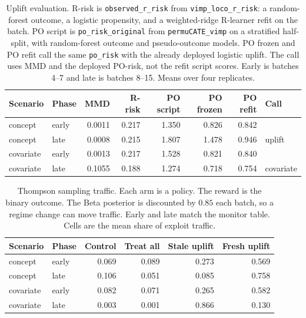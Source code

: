\begin{table}[t]
\centering
\caption{Uplift evaluation. R-risk is \texttt{observed\_r\_risk} from \texttt{vimp\_loco\_r\_risk}: a random-forest outcome, a logistic propensity, and a weighted-ridge R-learner refit on the batch. PO script is \texttt{po\_risk\_original} from \texttt{permuCATE\_vimp} on a stratified half-split, with random-forest outcome and pseudo-outcome models. PO frozen and PO refit call the same \texttt{po\_risk} with the already deployed logistic uplift. The call uses MMD and the deployed PO-risk, not the refit script scores. Early is batches 4--7 and late is batches 8--15. Means over four replicates.}
\label{tab:uplift-monitor}
\begin{tabular}{llrrrrrl}
\toprule
Scenario & Phase & MMD & R-risk & PO script & PO frozen & PO refit & Call \\
\midrule
concept & early & 0.0011 & 0.217 & 1.350 & 0.826 & 0.842 &  \\
concept & late & 0.0008 & 0.215 & 1.807 & 1.478 & 0.946 & uplift \\
covariate & early & 0.0013 & 0.217 & 1.528 & 0.821 & 0.840 &  \\
covariate & late & 0.1055 & 0.188 & 1.274 & 0.718 & 0.754 & covariate \\
\bottomrule
\end{tabular}
\end{table}

\begin{table}[t]
\centering
\caption{Thompson sampling traffic. Each arm is a policy. The reward is the binary outcome. The Beta posterior is discounted by $0.85$ each batch, so a regime change can move traffic. Early and late match the monitor table. Cells are the mean share of exploit traffic.}
\label{tab:uplift-thompson}
\begin{tabular}{llrrrr}
\toprule
Scenario & Phase & Control & Treat all & Stale uplift & Fresh uplift \\
\midrule
concept & early & 0.069 & 0.089 & 0.273 & 0.569 \\
concept & late & 0.106 & 0.051 & 0.085 & 0.758 \\
covariate & early & 0.082 & 0.071 & 0.265 & 0.582 \\
covariate & late & 0.003 & 0.001 & 0.866 & 0.130 \\
\bottomrule
\end{tabular}
\end{table}

